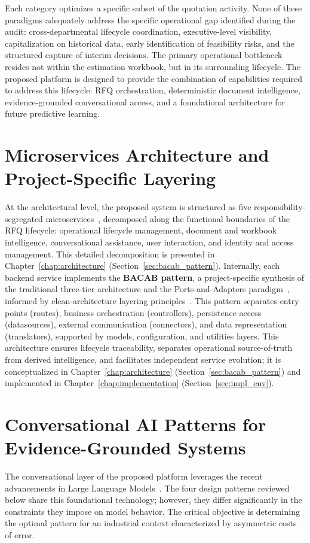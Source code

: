 Each category optimizes a specific subset of the quotation activity. None of these paradigms adequately address the specific operational gap identified during the \clientCompany audit: cross-departmental lifecycle coordination, executive-level visibility, capitalization on historical data, early identification of feasibility risks, and the structured capture of interim decisions. The primary operational bottleneck resides not within the estimation workbook, but in its surrounding lifecycle. The proposed platform is designed to provide the combination of capabilities required to address this lifecycle: RFQ orchestration, deterministic document intelligence, evidence-grounded conversational access, and a foundational architecture for future predictive learning.

\section{Microservices Architecture and Project-Specific Layering}\label{sec:microservices_layering}
At the architectural level, the proposed system is structured as five responsibility-segregated microservices~\cite{newman2021microservices}, decomposed along the functional boundaries of the RFQ lifecycle: operational lifecycle management, document and workbook intelligence, conversational assistance, user interaction, and identity and access management. This detailed decomposition is presented in Chapter~\ref{chap:architecture} (Section~\ref{sec:bacab_pattern}). Internally, each backend service implements the \textbf{BACAB pattern}, a project-specific synthesis of the traditional three-tier architecture and the Ports-and-Adapters paradigm~\cite{cockburn2005hexagonal}, informed by clean-architecture layering principles~\cite{martin2017cleanarch}. This pattern separates entry points (routes), business orchestration (controllers), persistence access (datasources), external communication (connectors), and data representation (translators), supported by models, configuration, and utilities layers. This architecture ensures lifecycle traceability, separates operational source-of-truth from derived intelligence, and facilitates independent service evolution; it is conceptualized in Chapter~\ref{chap:architecture} (Section~\ref{sec:bacab_pattern}) and implemented in Chapter~\ref{chap:implementation} (Section~\ref{sec:impl_env}).

\section{Conversational AI Patterns for Evidence-Grounded Systems}\label{sec:conversational_ai_patterns}
The conversational layer of the proposed platform leverages the recent advancements in Large Language Models~\cite{brown2020gpt3}. The four design patterns reviewed below share this foundational technology; however, they differ significantly in the constraints they impose on model behavior. The critical objective is determining the optimal pattern for an industrial context characterized by asymmetric costs of error.

